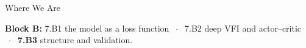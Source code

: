 

\graphicspath{{./figures/}}

\newcommand{\repo}[2]{\href{https://github.com/vonzhg/Macro-2026Fall/blob/main/#1}{\texttt{#2}}}





\makedecktitle

\begin{frame}{Where We Are}
\vspace{-1mm}
\begin{center}
\small \textbf{Block B:} 7.B1 the model as a loss function $\;\cdot\;$ 7.B2 deep VFI and actor--critic $\;\cdot\;$ \textbf{7.B3} structure and validation.
\end{center}
\end{frame}

